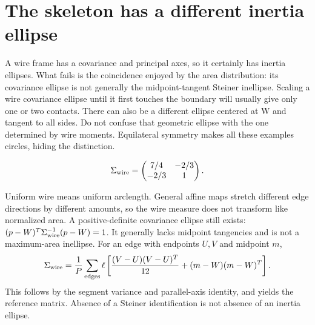 \documentclass[11pt,oneside,openany]{book}
\begin{document}
\section{The skeleton has a different inertia ellipse}\label{sec:slide14}

A wire frame has a covariance and principal axes, so it certainly has inertia ellipses. What fails is the coincidence enjoyed by the area distribution: its covariance ellipse is not generally the midpoint-tangent Steiner inellipse. Scaling a wire covariance ellipse until it first touches the boundary will usually give only one or two contacts. There can also be a different ellipse centered at W and tangent to all sides. Do not confuse that geometric ellipse with the one determined by wire moments. Equilateral symmetry makes all these examples circles, hiding the distinction.


\[\Sigma_{\rm wire}=\begin{pmatrix}7/4&-2/3\\-2/3&1\end{pmatrix}.\]



Uniform wire means uniform arclength. General affine maps stretch
different edge directions by different amounts, so the wire measure
does not transform like normalized area. A positive-definite covariance
ellipse still exists:
$(p-W)^T\Sigma_{\rm wire}^{-1}(p-W)=1$.
It generally lacks midpoint tangencies and is not a maximum-area
inellipse. For an edge with endpoints $U,V$ and midpoint $m$,
\[
\Sigma_{\rm wire}=\frac1P\sum_{\rm edges}\ell
\left[\frac{(V-U)(V-U)^T}{12}+(m-W)(m-W)^T\right].
\]
This follows by the segment variance and parallel-axis identity,
and yields the reference matrix. Absence of a Steiner identification
is not absence of an inertia ellipse.
\end{document}
